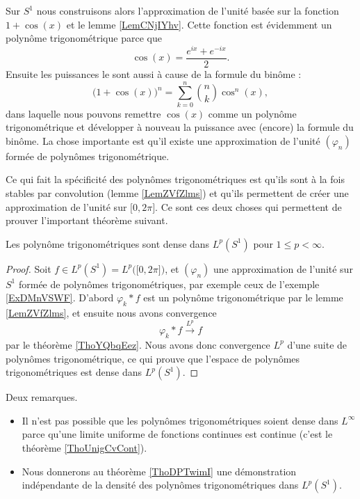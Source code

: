 \begin{example} \label{ExDMnVSWF}
    Sur \( S^1\) nous construisons alors l'approximation de l'unité basée sur la fonction \( 1+\cos(x)\) et le lemme \ref{LemCNjIYhv}. Cette fonction est évidemment un polynôme trigonométrique parce que
    \begin{equation}
        \cos(x)=\frac{  e^{ix}+ e^{-ix} }{2}.
    \end{equation}
    Ensuite les puissances le sont aussi à cause de la formule du binôme :
    \begin{equation}
        \big( 1+\cos(x) \big)^n=\sum_{k=0}^n\binom{ n }{ k }\cos^n(x),
    \end{equation}
    dans laquelle nous pouvons remettre \( \cos(x)\) comme un polynôme trigonométrique et développer à nouveau la puissance avec (encore) la formule du binôme. La chose importante est qu'il existe une approximation de l'unité \( (\varphi_n)\) formée de polynômes trigonométrique.

    Ce qui fait la spécificité des polynômes trigonométriques est qu'ils sont à la fois stables par convolution (lemme \ref{LemZVfZlms}) et qu'ils permettent de créer une approximation de l'unité sur \( \mathopen[ 0 , 2\pi \mathclose]\). Ce sont ces deux choses qui permettent de prouver l'important théorème suivant.
\end{example}

\begin{theorem} \label{ThoQGPSSJq}
    Les polynôme trigonométriques sont dense dans \( L^p(S^1)\) pour \( 1\leq p<\infty\).
\end{theorem}

\begin{proof}
    Soit \( f\in L^p(S^1)=L^p\big( \mathopen[ 0 , 2\pi \mathclose] \big)\), et \( (\varphi_n)\) une approximation de l'unité sur \( S^1\) formée de polynômes trigonométriques, par exemple ceux de l'exemple \ref{ExDMnVSWF}. D'abord \( \varphi_k*f\) est un polynôme trigonométrique par le lemme \ref{LemZVfZlms}, et ensuite nous avons convergence
    \begin{equation}
        \varphi_k*f\stackrel{L^p}{\to}f
    \end{equation}
    par le théorème \ref{ThoYQbqEez}. Nous avons donc convergence \( L^p\) d'une suite de polynômes trigonométrique, ce qui prouve que l'espace de polynômes trigonométriques est dense dans \( L^p(S^1)\).
\end{proof}

\begin{remark}
    Deux remarques.
    \begin{itemize}
        \item
            Il n'est pas possible que les polynômes trigonométriques soient dense dans \( L^{\infty}\) parce qu'une limite uniforme de fonctions continues est continue (c'est le théorème \ref{ThoUnigCvCont}).
        \item
            Nous donnerons au théorème \ref{ThoDPTwimI} une démonstration indépendante de la densité des polynômes trigonométriques dans \( L^p(S^1)\).
    \end{itemize}
\end{remark}

